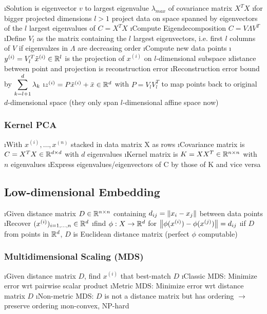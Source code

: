 \i Solution is eigenvector $v$ to largest eigenvalue $\lambda_{max}$ of covariance matrix $X^TX$
\i for bigger projected dimensions $l > 1$ project data on space spanned by eigenvectors of the $l$ largest eigenvalues of $C = X^TX$
\ei
\i Compute Eigendecomposition $C = V \Lambda V^T$
\i Define $V_l$ as the matrix containing the $l$ largest eigenvectors, i.e. first $l$ columns of $V$ if eigenvalzes in $\Lambda$ are decreasing order
\i Compute new data points 
\bi
\i $y^{(i)} = V_l^T \tilde x^{(i)} \in \mathbb{R}^l$ is the projection of $x^{(i)}$ on $l$-dimensional subspace
\bi
\i distance between point and projection is reconstruction error
\i Reconstruction error bound by $\displaystyle\sum_{k=l+1}^d \lambda_k$
\ei
\i $z^{(i)} = P \tilde x^{(i)} + \bar x \in \mathbb{R}^d$ with $P = V_l V_l^T$ to map points back to original $d$-dimensional space (they only span $l$-dimensional affine space now)
\ei
\ee

\subsubsection{Kernel PCA}

\bi
\i With $x^{(i)},\ldots,x^{(n)}$ stacked in data matrix X as rows
\i Covariance matrix is $C=X^TX \in \mathbb{R}^{d\times d}$ with $d$ eigenvalues
\i Kernel matrix is $K = XX^T \in \mathbb{R}^{n\times n}$ with $n$ eigenvalues
\i Express eigenvalues/eigenvectors of C by those of K and vice versa
\ei

\subsection{Low-dimensional Embedding}

\bi
\i Given distance matrix $D \in \mathbb{R}^{n \times n}$ containing $d_{ij} = \left\lVert x_i-x_j\right\rVert$ between data points
\i Recover $(x^{(i)})_{i=1,\ldots,n} \in \mathbb{R}^d$
\i find $\phi: X \to \mathbb{R}^d$ for $\left\lVert\phi(x^{(i)}) - \phi(x^{(j)})\right\rVert = d_{ij}$
\i if $D$ from points in $\mathbb{R}^d$, $D$ is Euclidean distance matrix (perfect $\phi$ computable)
\ei

\subsubsection{Multidimensional Scaling (MDS)}

\bi
\i Given distance matrix $D$, find $x^{(i)}$ that best-match $D$
\i Classic MDS: Minimize error wrt pairwise scalar product
\i Metric MDS: Minimize error wrt distance matrix $D$
\i Non-metric MDS: $D$ is not a distance matrix but has ordering $\to$ preserve ordering
\i non-convex, NP-hard
\ei

